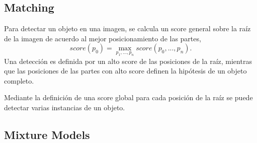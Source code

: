 \subsection{Matching}
\label{subsec:matching}
Para detectar un objeto en una imagen, se calcula un score general sobre la raíz de la imagen de acuerdo al mejor posicionamiento de las partes, $$ score(p_{0}) = \max_{p_{1}, ..., p_{n}} score(p_{0}, ..., p_{n}). $$ Una detección es definida por un alto score de las posiciones de la raíz, mientras que las posiciones de las partes con alto score definen la hipótesis de un objeto completo.

Mediante la definición de una score global para cada posición de la raíz se puede detectar varias instancias de un objeto.

\subsection{Mixture Models}
\label{subsec:mm}